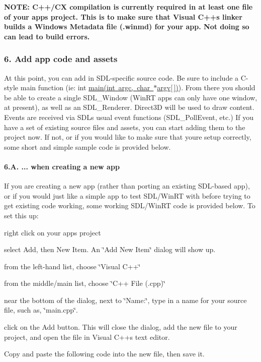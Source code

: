 {\bfseries N\+O\+TE\+: C++/\+CX compilation is currently required in at least one file of your app\textquotesingle{}s project. This is to make sure that Visual C++\textquotesingle{}s linker builds a \textquotesingle{}Windows Metadata\textquotesingle{} file (.winmd) for your app. Not doing so can lead to build errors.}

\subsubsection*{6. Add app code and assets}

At this point, you can add in S\+D\+L-\/specific source code. Be sure to include a C-\/style main function (ie\+: {\ttfamily int \mbox{\hyperlink{main_8cpp_a0ddf1224851353fc92bfbff6f499fa97}{main(int argc, char $\ast$argv\mbox{[}$\,$\mbox{]})}}}). From there you should be able to create a single {\ttfamily S\+D\+L\+\_\+\+Window} (Win\+RT apps can only have one window, at present), as well as an {\ttfamily S\+D\+L\+\_\+\+Renderer}. Direct3D will be used to draw content. Events are received via S\+DL\textquotesingle{}s usual event functions ({\ttfamily S\+D\+L\+\_\+\+Poll\+Event}, etc.) If you have a set of existing source files and assets, you can start adding them to the project now. If not, or if you would like to make sure that you\textquotesingle{}re setup correctly, some short and simple sample code is provided below.

\paragraph*{6.\+A. ... when creating a new app}

If you are creating a new app (rather than porting an existing S\+D\+L-\/based app), or if you would just like a simple app to test S\+D\+L/\+Win\+RT with before trying to get existing code working, some working S\+D\+L/\+Win\+RT code is provided below. To set this up\+:


\begin{DoxyEnumerate}
\item right click on your app\textquotesingle{}s project
\item select Add, then New Item. An \char`\"{}\+Add New Item\char`\"{} dialog will show up.
\item from the left-\/hand list, choose \char`\"{}\+Visual C++\char`\"{}
\item from the middle/main list, choose \char`\"{}\+C++ File (.\+cpp)\char`\"{}
\item near the bottom of the dialog, next to \char`\"{}\+Name\+:\char`\"{}, type in a name for your source file, such as, \char`\"{}main.\+cpp\char`\"{}.
\item click on the Add button. This will close the dialog, add the new file to your project, and open the file in Visual C++\textquotesingle{}s text editor.
\item Copy and paste the following code into the new file, then save it.
\end{DoxyEnumerate}

